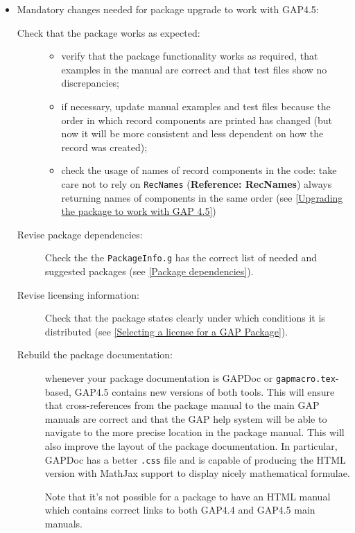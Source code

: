 \documentclass[a4paper,11pt]{report}
\begin{document}
{{{ 
\begin{itemize}
\item  Mandatory changes needed for package upgrade to work with \textsf{GAP}{\nobreakspace}4.5: 
\begin{description}
\item[{ Check that the package works as expected: }]  
\begin{itemize}
\item  verify that the package functionality works as required, that examples in the
manual are correct and that test files show no discrepancies; 
\item  if necessary, update manual examples and test files because the order in which
record components are printed has changed (but now it will be more consistent
and less dependent on how the record was created); 
\item  check the usage of names of record components in the code: take care not to
rely on \texttt{RecNames} (\textbf{Reference: RecNames}) always returning names of components in the same order (see \ref{Upgrading the package to work with GAP 4.5}) 
\end{itemize}
 
\item[{ Revise package dependencies: }]  Check the the \texttt{PackageInfo.g} has the correct list of needed and suggested packages (see \ref{Package dependencies}). 
\item[{ Revise licensing information: }]  Check that the package states clearly under which conditions it is distributed
(see \ref{Selecting a license for a GAP Package}). 
\item[{ Rebuild the package documentation: }]  whenever your package documentation is \textsf{GAPDoc} or \texttt{gapmacro.tex}-based, \textsf{GAP}{\nobreakspace}4.5 contains new versions of both tools. This will ensure that
cross-references from the package manual to the main \textsf{GAP} manuals are correct and that the \textsf{GAP} help system will be able to navigate to the more precise location in the
package manual. This will also improve the layout of the package
documentation. In particular, \textsf{GAPDoc} has a better \texttt{.css} file and is capable of producing the HTML version with MathJax support to
display nicely mathematical formulae. 

 Note that it's not possible for a package to have an HTML manual which
contains correct links to both \textsf{GAP}{\nobreakspace}4.4 and \textsf{GAP}{\nobreakspace}4.5 main manuals. 
\end{description}
 

\end{itemize}}}}
\end{document}
